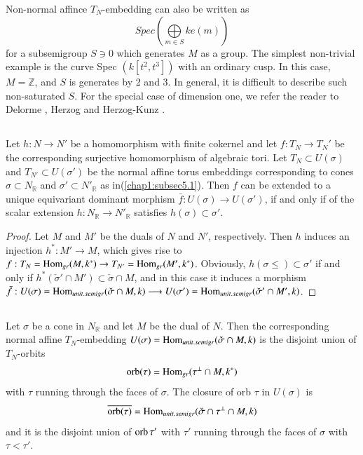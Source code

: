 \begin{remark*}
Non-normal affince $T_N$-embedding can also be written as  
$$
Spec (\bigoplus\limits_{m \in S} ke (m)) 
$$
for a subsemigroup $S \ni 0 $ which generates $M$ as a group. The
simplest non-trivial example is the curve Spec $(k [t^2 , t^3])$ with
an ordinary cusp. In this case, $M = \mathbb{Z}$, and $S$ is generates
by 2 and 3. In general, it is difficult to describe such
non-saturated $S$. For the special case of dimension one, we refer the
reader to Delorme \cite{keyD1}, Herzog \cite{keyH2} and Herzog-Kunz
\cite{keyHK}.   
\end{remark*}

\subsection{}\label{chap1:subsec5.2}%
 Let $h : N \to N'$ be a homomorphism with finite
cokernel and let $f:T_N \to T_N'$ be the corresponding surjective
homomorphism of algebraic tori. Let $T_N \subset U(\sigma)$ and
$T_{N'} \subset U (\sigma')$ be the
normal affine torus embeddings corresponding to cones $\sigma \subset
N_\mathbb{R}$ and $\sigma' \subset N'_\mathbb{R}$ as 
in\pageoriginale (\ref{chap1:subsec5.1}). Then $f$ can be extended to a unique
equivariant dominant 
morphism $\bar{f}: U (\sigma) \to U(\sigma')$, if and only if of the
scalar extension $h : N_\mathbb{R}\to N'_\mathbb{R}$ satisfies
$h(\sigma) \subset \sigma'$.  

\begin{proof}
Let $M$ and $M'$ be the duals of $N$ and $N'$, respectively. Then $h$
induces an injection $h^* : M' \to M$, which gives rise to $f : T_N =
\operatorname{Hom}_{gr}(M, k^*) \to T_{N'} = \operatorname{Hom}_{gr} (M', k^*)$. Obviously,
$h(\sigma \leq) \subset \sigma'$ if and only if 
$h^*(\check{\sigma}' \cap M') \subset \check{\sigma}\cap M$, and in
this case it induces a morphism $\bar{f}: U(\sigma)=
\operatorname{Hom}_{unit.semigr}(\check{\sigma}\cap M, k)\longrightarrow U(\sigma')
= \operatorname{Hom}_{unit.semigr} ( \check{\sigma}'\cap M', k)$.  
\end{proof}

\subsection{}\label{chap1:subsec5.3}%
 Let $\sigma$ be a cone in $N_{\mathbb{R}}$ and let $M$ be the
dual of $N$. Then the corresponding normal affine
$T_N$-embedding $U(\sigma)= \operatorname{Hom}_{unit. semigr} ( \check{\sigma}
\cap M, k)$ is the disjoint union of $T_N$-orbits  
$$
\operatorname{orb} (\tau) = \operatorname{Hom}_{gr}(\tau^\perp \cap M, k^*) 
$$
with $\tau$ running through the faces of $\sigma$. The closure of orb 
$\tau$ in $U(\sigma)$ is  
$$
\overline{\operatorname{orb} (\tau)} = \operatorname{Hom}_{unit. semigr}(\check{\sigma} \cap
\tau^\perp \cap M, k) 
$$
and it is the disjoint union of $\operatorname{orb} \tau'$ with $\tau'$ running
through the faces of $\sigma$ with $\tau < \tau' $. 

